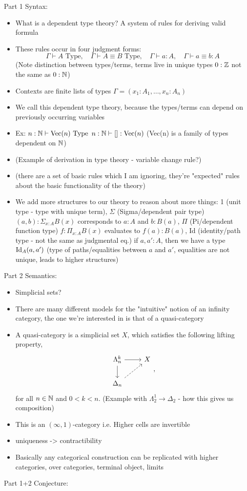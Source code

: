 \documentclass{article}
\begin{document}
Part 1 Syntax:
\begin{itemize}
    \item What is a dependent type theory? A system of rules for deriving valid formula
    \item These rules occur in four judgment forms:
    $$ \Gamma\vdash A\text{ Type},\quad\Gamma\vdash A\equiv B\text{ Type},\quad\Gamma\vdash a:A,\quad\Gamma\vdash a\equiv b:A $$
    (Note distinction between types/terms, terms live in unique types $0:\mathbb{Z}$ not the same as $0:\mathbb{N}$)
    \item Contexts are finite lists of types $\Gamma=(x_1:A_1,\dots,x_n:A_n)$
    \item We call this dependent type theory, because the types/terms can depend on previously occurring variables
    \item Ex: $n:\mathbb{N}\vdash\text{Vec}(n)\text{ Type}$ $n:\mathbb{N}\vdash[]:\text{Vec}(n)$ (Vec(n) is a family of types dependent on $\mathbb{N}$)
    \item (Example of derivation in type theory - variable change rule?)
    \item (there are a set of basic rules which I am ignoring, they're "expected" rules about the basic functionality of the theory)
    \item We add more structures to our theory to reason about more things: 1 (unit type - type with unique term), $\Sigma$ (Sigma/dependent pair type) $(a,b):\Sigma_{x:A}B(x)$ corresponds to $a:A$ and $b:B(a)$, $\Pi$ (Pi/dependent function type) $f:\Pi_{x:A}B(x)$ evaluates to $f(a):B(a)$, Id (identity/path type - not the same as judgmental eq.) if $a,a':A$, then we have a type $\operatorname{Id}_A(a,a')$ (type of paths/equalities between $a$ and $a'$, equalities are not unique, leads to higher structures)
\end{itemize}

Part 2 Semantics:
\begin{itemize}
    \item Simplicial sets?
    \item There are many different models for the "intuitive" notion of an infinity category, the one we're interested in is that of a quasi-category
    \item \begin{definition}
        A quasi-category is a simplicial set $X$, which satisfies the following lifting property,
        \[\begin{tikzcd}
            \Lambda_n^k \arrow[r] \arrow[d] & X\\
            \Delta_n \arrow[ur, dashed]
        \end{tikzcd},\]
        for all $n\in\mathbb{N}$ and $0<k<n$. (Example with $\Lambda^1_2\to\Delta_2$ - how this gives us composition)
    \end{definition}
    \item This is an $(\infty,1)$-category i.e. Higher cells are invertible
    \item uniqueness -> contractibility
    \item Basically any categorical construction can be replicated with higher categories, over categories, terminal object, limits
\end{itemize}

Part 1+2 Conjecture:
\end{document}
